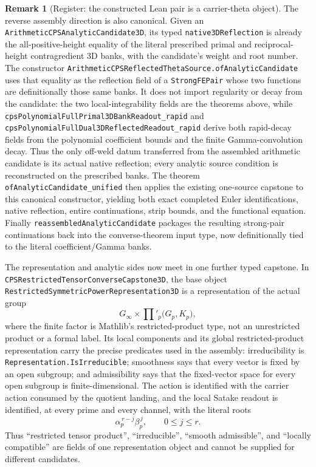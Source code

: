 \documentclass[11pt]{article}
\theoremstyle{definition}
\newtheorem{remark}[theorem]{Remark}
\begin{document}
\begin{remark}[Register: the constructed Lean pair is a carrier-theta object]
The reverse assembly direction is also canonical.  Given an
\texttt{ArithmeticCPSAnalyticCandidate3D}, its typed
\texttt{native3DReflection} is already the all-positive-height equality of the literal prescribed
primal and reciprocal-height contragredient 3D banks, with the candidate's weight and root number.
The constructor \texttt{ArithmeticCPSReflectedThetaSource.ofAnalyticCandidate} uses that equality
as the reflection field of a \texttt{StrongFEPair} whose two functions are definitionally those
same banks.  It does not import regularity or decay from the candidate: the two local-integrability
fields are the theorems above, while
\texttt{cpsPolynomialFullPrimal3DBankReadout\_rapid} and
\texttt{cpsPolynomialFullDual3DReflectedReadout\_rapid} derive both rapid-decay fields from the
polynomial coefficient bounds and the finite Gamma-convolution decay.  Thus the only off-weld
datum transferred from the assembled arithmetic candidate is its actual native reflection; every
analytic source condition is reconstructed on the prescribed banks.
The theorem \texttt{ofAnalyticCandidate\_unified} then applies the existing one-source capstone to
this canonical constructor, yielding both exact completed Euler identifications, native
reflection, entire continuations, strip bounds, and the functional equation.  Finally
\texttt{reassembledAnalyticCandidate} packages the resulting strong-pair continuations back into
the converse-theorem input type, now definitionally tied to the literal coefficient/Gamma banks.

The representation and analytic sides now meet in one further typed capstone.  In
\texttt{CPSRestrictedTensorConverseCapstone3D}, the base object
\texttt{RestrictedSymmetricPowerRepresentation3D} is a representation of the actual group
\[
 G_\infty\times\prod
 {}'_p\bigl(G_p,K_p\bigr),
\]
where the finite factor is Mathlib's restricted-product type, not an unrestricted product or a
formal label.  Its local components and its global restricted-product representation carry the
precise predicates used in the assembly: irreducibility is
\texttt{Representation.IsIrreducible}; smoothness says that every vector is fixed by an open
subgroup; and admissibility says that the fixed-vector space for every open subgroup is
finite-dimensional.  The action is identified with the carrier action consumed by the quotient
landing, and the local Satake readout is identified, at every prime and every channel, with the
literal roots
\[
  \alpha_p^{\,r-j}\beta_p^{\,j},\qquad 0\le j\le r.
\]
Thus ``restricted tensor product'', ``irreducible'', ``smooth admissible'', and ``locally
compatible'' are fields of one representation object and cannot be supplied for different
candidates.


\end{remark}
\end{document}
